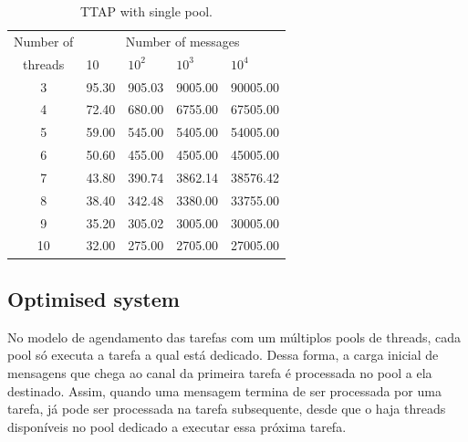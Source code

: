 \begin{table}[htb]
\centering
\caption{TTAP with single pool.}
\label{tab:TTAP_single}
\begin{tabular}{cllll}
\hline
\multicolumn{1}{c}{Number of} & \multicolumn{4}{c}{Number of messages} \\
\multicolumn{1}{c}{threads}   & 10         & $10^2$      & $10^3$         & $10^4$    \\ \hline
3                             & 95.30      & 905.03      & 9005.00        & 90005.00        \\
4                             & 72.40      & 680.00      & 6755.00        & 67505.00        \\
5                             & 59.00      & 545.00      & 5405.00        & 54005.00        \\
6                             & 50.60      & 455.00      & 4505.00        & 45005.00        \\
7                             & 43.80      & 390.74      & 3862.14        & 38576.42        \\
8                             & 38.40      & 342.48      & 3380.00        & 33755.00        \\
9                             & 35.20      & 305.02      & 3005.00        & 30005.00        \\
10                            & 32.00      & 275.00      & 2705.00        & 27005.00        \\ \hline
\end{tabular}
\end{table}     

\subsection{Optimised system}
\label{subsec:optimised_system}
No modelo de agendamento das tarefas com um múltiplos pools de threads, cada pool só executa a tarefa a qual está dedicado. Dessa forma, a carga inicial de mensagens que chega ao canal da primeira tarefa é processada no pool a ela destinado. Assim, quando uma mensagem termina de ser processada por uma tarefa, já pode ser processada na tarefa subsequente, desde que o haja threads disponíveis no pool dedicado a executar essa próxima tarefa. 

